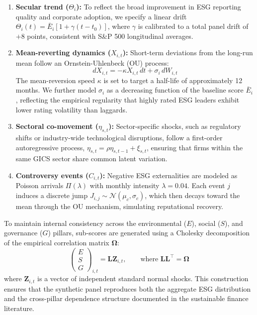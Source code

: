 \begin{enumerate}
  \item \textbf{Secular trend ($\Theta_i$):} To reflect the broad improvement in ESG reporting quality and corporate adoption, we specify a linear drift $\Theta_i(t) = \bar{E}_i[1 + \gamma(t - t_0)]$, where $\gamma$ is calibrated to a total panel drift of $+8$ points, consistent with S\&P 500 longitudinal averages.

  \item \textbf{Mean-reverting dynamics ($X_{i,t}$):} Short-term deviations from the long-run mean follow an Ornstein-Uhlenbeck (OU) process:
  \begin{equation}
    dX_{i,t} = -\kappa X_{i,t}\,dt + \sigma_i\,dW_{i,t}
  \end{equation}
  The mean-reversion speed $\kappa$ is set to target a half-life of approximately 12 months. We further model $\sigma_i$ as a decreasing function of the baseline score $\bar{E}_i$, reflecting the empirical regularity that highly rated ESG leaders exhibit lower rating volatility than laggards.

  \item \textbf{Sectoral co-movement ($\eta_{s,t}$):} Sector-specific shocks, such as regulatory shifts or industry-wide technological disruptions, follow a first-order autoregressive process, $\eta_{s,t} = \rho\eta_{s,t-1} + \xi_{s,t}$, ensuring that firms within the same GICS sector share common latent variation.

  \item \textbf{Controversy events ($C_{i,t}$):} Negative ESG externalities are modeled as Poisson arrivals $\Pi(\lambda)$ with monthly intensity $\lambda = 0.04$. Each event $j$ induces a discrete jump $J_{i,j} \sim \mathcal{N}(\mu_c, \sigma_c)$, which then decays toward the mean through the OU mechanism, simulating reputational recovery.
\end{enumerate}

To maintain internal consistency across the environmental ($E$), social ($S$), and governance ($G$) pillars, sub-scores are generated using a Cholesky decomposition of the empirical correlation matrix $\mathbf{\Omega}$:
\begin{equation}
  \begin{pmatrix} E \\ S \\ G \end{pmatrix}_{i,t} = \mathbf{L}\mathbf{Z}_{i,t}, \qquad \text{where } \mathbf{L}\mathbf{L}^{\top} = \mathbf{\Omega}
\end{equation}
where $\mathbf{Z}_{i,t}$ is a vector of independent standard normal shocks. This construction ensures that the synthetic panel reproduces both the aggregate ESG distribution and the cross-pillar dependence structure documented in the sustainable finance literature.

